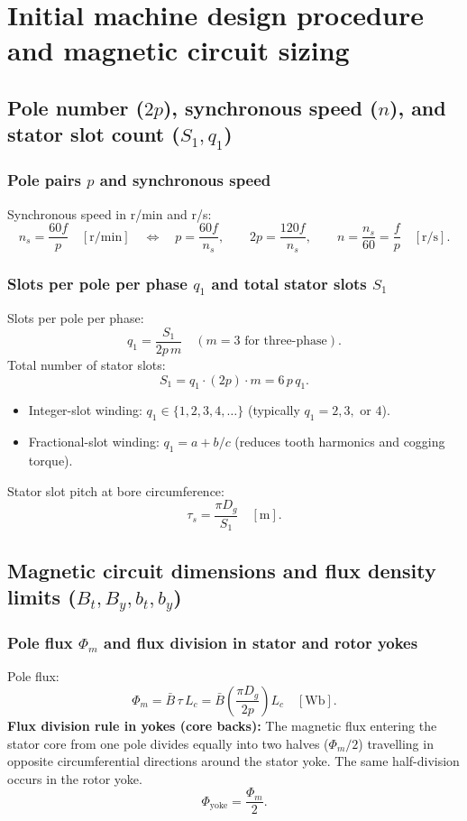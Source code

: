 \section{Initial machine design procedure and magnetic circuit sizing}

\subsection{Pole number ($2p$), synchronous speed ($n$), and stator slot count ($S_1, q_1$)}
\subsubsection{Pole pairs $p$ and synchronous speed}
Synchronous speed in r/min and r/s:
\[
n_s = \frac{60 f}{p}\quad[\mathrm{r/min}]
\quad\iff\quad
\boxed{p = \frac{60 f}{n_s}},
\qquad
\boxed{2p = \frac{120 f}{n_s}},
\qquad
\boxed{n = \frac{n_s}{60} = \frac{f}{p}\quad[\mathrm{r/s}]}.
\]

\subsubsection{Slots per pole per phase $q_1$ and total stator slots $S_1$}
Slots per pole per phase:
\[
q_1 = \frac{S_1}{2p\,m}\quad(m=3\text{ for three-phase}).
\]
Total number of stator slots:
\[
\boxed{S_1 = q_1\cdot(2p)\cdot m = 6\,p\,q_1}.
\]
\begin{itemize}
  \item Integer-slot winding: $q_1 \in \{1, 2, 3, 4, \dots\}$ (typically $q_1 = 2, 3, \text{ or } 4$).
  \item Fractional-slot winding: $q_1 = a + b/c$ (reduces tooth harmonics and cogging torque).
\end{itemize}
Stator slot pitch at bore circumference:
\[
\boxed{\tau_s = \frac{\pi D_g}{S_1}}\quad[\mathrm{m}].
\]

\subsection{Magnetic circuit dimensions and flux density limits ($B_t, B_y, b_t, b_y$)}
\subsubsection{Pole flux $\Phi_m$ and flux division in stator and rotor yokes}
Pole flux:
\[
\boxed{\Phi_m = \bar{B}\,\tau\,L_c = \bar{B}\left(\frac{\pi D_g}{2p}\right)L_c}\quad[\mathrm{Wb}].
\]
\textbf{Flux division rule in yokes (core backs):}
The magnetic flux entering the stator core from one pole divides equally into two halves ($\Phi_m/2$) travelling in opposite circumferential directions around the stator yoke.
The same half-division occurs in the rotor yoke.
\[
\boxed{\Phi_{\mathrm{yoke}} = \frac{\Phi_m}{2}}.
\]

